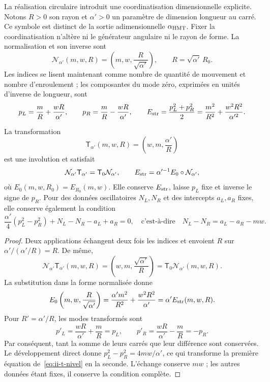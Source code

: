 La réalisation circulaire introduit une coordinatisation dimensionnelle explicite.
Notons \(R>0\) son rayon et \(\alpha'>0\) un paramètre
de dimension longueur au carré. Ce symbole est distinct de la sortie
adimensionnelle \(\alpha_{\rm HMT}\). Fixer la coordinatisation n’altère ni le
générateur angulaire ni le rayon de forme. La normalisation et son inverse sont
\[
 \mathcal N_{\alpha'}(m,w,R)
 =\left(m,w,\frac{R}{\sqrt{\alpha'}}\right),\qquad
 R=\sqrt{\alpha'}\,R_0.
\]
Les indices se lisent maintenant comme nombre de quantité de mouvement et nombre
d’enroulement ; les composantes du mode zéro, exprimées en unités
d’inverse de longueur, sont
\begin{equation}
 p_L=\frac mR+\frac{wR}{\alpha'},\qquad
 p_R=\frac mR-\frac{wR}{\alpha'},\qquad
 E_{\rm str}=\frac{p_L^2+p_R^2}{2}
 =\frac{m^2}{R^2}+\frac{w^2R^2}{\alpha'^2}.
 \label{eq:ii-t-quirales}
\end{equation}

\begin{theorem}
\label{thm:ii-t-cuerda}
La transformation
\[
 \mathsf T_{\alpha'}(m,w,R)=\left(w,m,\frac{\alpha'}R\right)
\]
est une involution et satisfait
\begin{equation}
 \mathcal N_{\alpha'}\mathsf T_{\alpha'}
 =\mathsf T_0\mathcal N_{\alpha'},\qquad
 E_{\rm str}=\alpha'^{-1}E_0\circ\mathcal N_{\alpha'},
 \label{eq:ii-t-normalizacion}
\end{equation}
où \(E_0(m,w,R_0)=E_{R_0}(m,w)\). Elle conserve \(E_{\rm str}\),
laisse \(p_L\) fixe et inverse le signe de \(p_R\). Pour des données
oscillatoires \(N_L,N_R\) et des intercepts \(a_L,a_R\) fixes,
elle conserve également la condition
\begin{equation}
 \frac{\alpha'}4(p_L^2-p_R^2)+N_L-N_R-a_L+a_R=0,
 \quad\text{c’est-à-dire}\quad
 N_L-N_R=a_L-a_R-mw.
 \label{eq:ii-t-nivel}
\end{equation}
\end{theorem}

\begin{proof}
Deux applications échangent deux fois les indices et envoient
\(R\) sur \(\alpha'/(\alpha'/R)=R\). De même,
\[
 \mathcal N_{\alpha'}\mathsf T_{\alpha'}(m,w,R)
 =\left(w,m,\frac{\sqrt{\alpha'}}R\right)
 =\mathsf T_0\mathcal N_{\alpha'}(m,w,R).
\]
La substitution dans la forme normalisée donne
\[
 E_0\left(m,w,\frac R{\sqrt{\alpha'}}\right)
 =\frac{\alpha'm^2}{R^2}+\frac{w^2R^2}{\alpha'}
 =\alpha'E_{\rm str}(m,w,R).
\]
Pour \(R'=\alpha'/R\), les modes transformés sont
\[
 p'_L=\frac{wR}{\alpha'}+\frac mR=p_L,\qquad
 p'_R=\frac{wR}{\alpha'}-\frac mR=-p_R.
\]
Par conséquent, tant la somme de leurs carrés que leur différence sont conservées.
Le développement direct donne \(p_L^2-p_R^2=4mw/\alpha'\), ce qui
transforme la première équation de~\eqref{eq:ii-t-nivel} en la seconde.
L’échange conserve \(mw\) ; les autres données étant fixes, il conserve
la condition complète.
\end{proof}

